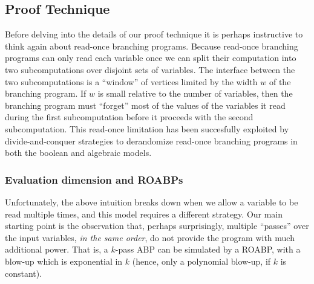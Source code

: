 \documentclass[11pt]{article}
\begin{document}
\subsection{Proof Technique}
\label{sec:technique}

Before delving into the details of our proof technique it is perhaps instructive to think again about read-once branching programs.
Because read-once branching programs can only read each variable once we can split their computation into two subcomputations over disjoint sets of variables.
The interface between the two subcomputations is a ``window'' of vertices limited by the width $w$ of the branching program.  
If $w$ is small relative to the number of variables, then the branching program must ``forget'' most of the values of the variables it read during the first subcomputation before it proceeds with the second subcomputation.
This read-once limitation has been succesfully exploited by divide-and-conquer strategies to derandomize read-once branching programs in both the boolean \cite{Nisan92} and algebraic \cite{JQS10, FS13, FSS14, agks15} models.


\subsubsection{Evaluation dimension and ROABPs}

Unfortunately, the above intuition breaks down when we allow a variable to be read multiple times, and this model requires a different strategy.
Our main starting point is the observation that, perhaps surprisingly, multiple ``passes'' over the input variables, {\em in the same order}, do not provide the program with much additional power.
That is, a $k$-pass ABP can be simulated by a ROABP, with a blow-up which is exponential in $k$ (hence, only a polynomial blow-up, if $k$ is constant).
\end{document}
